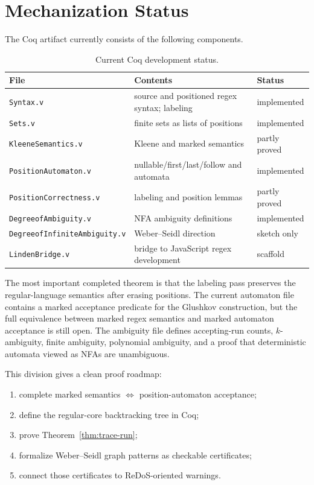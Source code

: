 \section{Mechanization Status}

The Coq artifact currently consists of the following components.

\begin{table}[t]
\caption{Current Coq development status.}
\label{tab:coq-status}
\begin{tabular}{lll}
\toprule
File & Contents & Status \\
\midrule
\texttt{Syntax.v} & source and positioned regex syntax; labeling & implemented \\
\texttt{Sets.v} & finite sets as lists of positions & implemented \\
\texttt{KleeneSemantics.v} & Kleene and marked semantics & partly proved \\
\texttt{PositionAutomaton.v} & nullable/first/last/follow and automata & implemented \\
\texttt{PositionCorrectness.v} & labeling and position lemmas & partly proved \\
\texttt{DegreeofAmbiguity.v} & NFA ambiguity definitions & implemented \\
\texttt{DegreeofInfiniteAmbiguity.v} & Weber--Seidl direction & sketch only \\
\texttt{LindenBridge.v} & bridge to JavaScript regex development & scaffold \\
\bottomrule
\end{tabular}
\end{table}

The most important completed theorem is that the labeling pass preserves the
regular-language semantics after erasing positions.  The current automaton file
contains a marked acceptance predicate for the Glushkov construction, but the
full equivalence between marked regex semantics and marked automaton acceptance
is still open.  The ambiguity file defines accepting-run counts, \(k\)-ambiguity,
finite ambiguity, polynomial ambiguity, and a proof that deterministic automata
viewed as NFAs are unambiguous.

This division gives a clean proof roadmap:
\begin{enumerate}
\item complete marked semantics \(\Leftrightarrow\) position-automaton
acceptance;
\item define the regular-core backtracking tree in Coq;
\item prove Theorem~\ref{thm:trace-run};
\item formalize Weber--Seidl graph patterns as checkable certificates;
\item connect those certificates to ReDoS-oriented warnings.
\end{enumerate}
